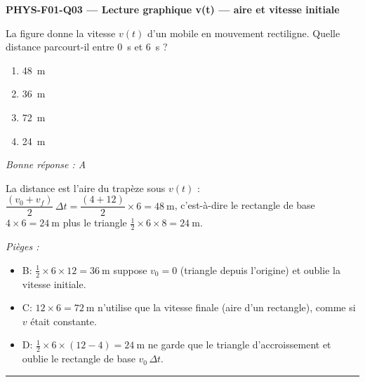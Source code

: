\documentclass[11pt,a4paper]{article}
\begin{document}
\noindent\textbf{PHYS-F01-Q03 --- Lecture graphique v(t) --- aire et vitesse initiale}\par
La figure donne la vitesse $v(t)$ d'un mobile en mouvement rectiligne. Quelle distance parcourt-il entre \qty{0}{\second} et \qty{6}{\second} ?
\begin{center}
\end{center}
\begin{enumerate}[label=\Alph*)]
\item \qty{48}{\metre}
\item \qty{36}{\metre}
\item \qty{72}{\metre}
\item \qty{24}{\metre}
\end{enumerate}
\textit{Bonne réponse : A}\par
La distance est l'aire du trapèze sous $v(t)$ : $\dfrac{(v_0+v_f)}{2}\,\Delta t=\dfrac{(4+12)}{2}\times 6=\qty{48}{\metre}$, c'est-à-dire le rectangle de base $4\times 6=\qty{24}{\metre}$ plus le triangle $\frac12\times 6\times 8=\qty{24}{\metre}$.\par
\textit{Pièges :}
\begin{itemize}
\item B: $\frac12\times 6\times 12=\qty{36}{\metre}$ suppose $v_0=0$ (triangle depuis l'origine) et oublie la vitesse initiale.
\item C: $12\times 6=\qty{72}{\metre}$ n'utilise que la vitesse finale (aire d'un rectangle), comme si $v$ était constante.
\item D: $\frac12\times 6\times(12-4)=\qty{24}{\metre}$ ne garde que le triangle d'accroissement et oublie le rectangle de base $v_0\,\Delta t$.
\end{itemize}
\vspace{8pt}\hrule\vspace{8pt}
\end{document}
